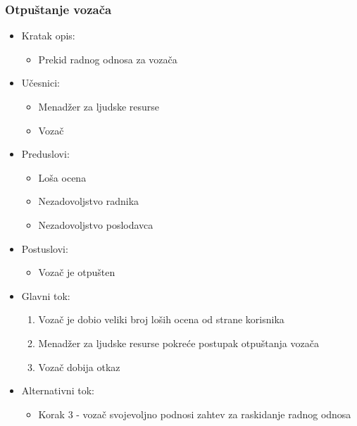 \subsubsection{\bfseries Otpuštanje vozača}
\begin{itemize}
	\item Kratak opis:
		\begin{itemize}
			\item Prekid radnog odnosa za vozača
		\end{itemize}

	\item Učesnici:
		\begin{itemize}
		    \item Menadžer za ljudske resurse
		    \item Vozač
		\end{itemize}


	\item Preduslovi:
		\begin{itemize}
		    \item Loša ocena
		    \item Nezadovoljstvo radnika
		    \item Nezadovoljstvo poslodavca
		\end{itemize}


	\item Postuslovi:
		\begin{itemize}
			\item Vozač je otpušten
	\end{itemize}

	\item Glavni tok:
		\begin{enumerate}
		    \item Vozač je dobio veliki broj loših ocena od strane korisnika
		    \item Menadžer za ljudske resurse pokreće postupak otpuštanja vozača
		    \item Vozač dobija otkaz
		\end{enumerate}

	\item Alternativni tok:
		\begin{itemize}
		    \item Korak 3 - vozač svojevoljno podnosi zahtev za raskidanje radnog odnosa
		\end{itemize}

\end{itemize}


